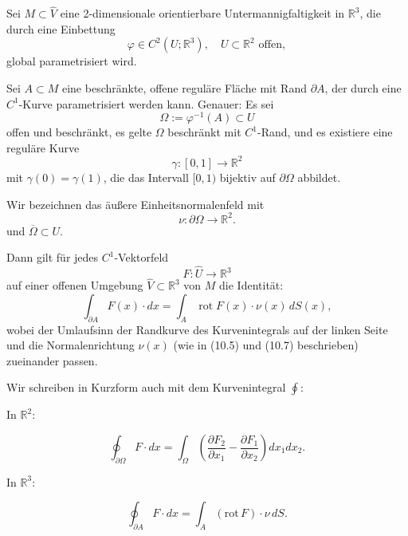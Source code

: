 \documentclass[11pt, a4paper]{article}
\begin{document}
\begin{theorem}

Sei $M \subset \hat{V}$ eine 2-dimensionale orientierbare Untermannigfaltigkeit in $\mathbb{R}^3$,  
die durch eine Einbettung 
\[
\varphi \in C^2(U ; \mathbb{R}^3), \quad U \subset \mathbb{R}^2 \text{ offen},
\] 
global parametrisiert wird.  

Sei $A \subset M$ eine beschränkte, offene reguläre Fläche mit Rand $\partial A$,  
der durch eine $C^1$-Kurve parametrisiert werden kann. Genauer:  
Es sei 
\[
\Omega := \varphi^{-1}(A) \subset U
\] 
offen und beschränkt, es gelte $\Omega$ beschränkt mit $C^1$-Rand,  
und es existiere eine reguläre Kurve
\[
\gamma : [0,1] \to \mathbb{R}^2
\] 
mit $\gamma(0) = \gamma(1)$, die das Intervall $[0,1)$ bijektiv auf $\partial \Omega$ abbildet.  

Wir bezeichnen das äußere Einheitsnormalenfeld mit
\[
\nu : \partial \Omega \to \mathbb{R}^2.
\] und $\overline{\Omega} \subset U$.  

Dann gilt für jedes $C^1$-Vektorfeld 
\[
F : \hat{U} \to \mathbb{R}^3
\] 
auf einer offenen Umgebung $\hat{V} \subset \mathbb{R}^3$ von $M$ die Identität:
\[
\int_{\partial A} F(x) \cdot dx
=
\int_A \operatorname{rot} F(x) \cdot \nu(x) \, dS(x),
\]
wobei der Umlaufsinn der Randkurve des Kurvenintegrals auf der linken Seite  
und die Normalenrichtung $\nu(x)$ (wie in (10.5) und (10.7) beschrieben) zueinander passen. \bigskip

Wir schreiben in Kurzform auch mit dem Kurvenintegral $\oint$: \bigskip

In $\mathbb{R}^2$:

\[
\oint_{\partial\Omega} F\cdot dx
=
\int_\Omega
\left(
\frac{\partial F_2}{\partial x_1}
-
\frac{\partial F_1}{\partial x_2}
\right)
dx_1 dx_2.
\]

In $\mathbb{R}^3$:

\[
\oint_{\partial A} F\cdot dx
=
\int_A (\mathrm{rot}\,F)\cdot \nu\, dS.
\]
\end{theorem}

\PropertyNotice
\end{document}
